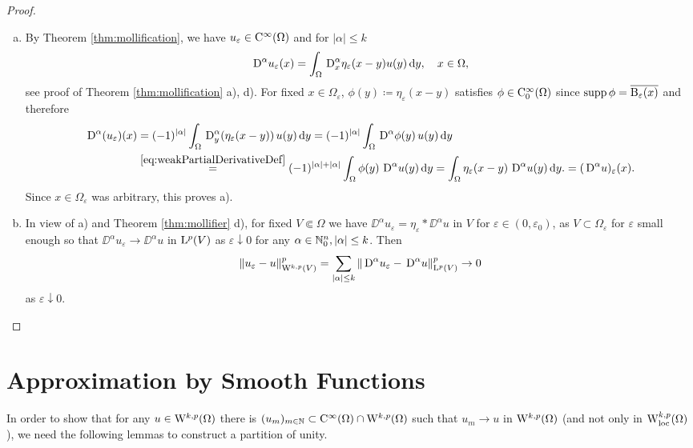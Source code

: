\begin{proof}
  \begin{enumerate}[a)]
    \item By Theorem \ref{thm:mollification}, we have $u_\varepsilon \in \mathrm{C}^\infty(\Omega)$ and for $|\alpha| \leq k$
  $$
    \,{\operatorname{D}}^\alpha u_\varepsilon(x) = \int_\Omega \,{\operatorname{D}}_x^\alpha \eta_\varepsilon(x - y) u(y) \, {\operatorname{d}\!{y}}, \quad x \in \Omega,
  $$
    see proof of Theorem \ref{thm:mollification} a), d).
    For fixed $x \in \Omega_\varepsilon$, $\phi(y) \coloneqq \eta_\varepsilon(x - y)$ satisfies $\phi \in \mathrm{C}_0^\infty(\Omega)$ since $\operatorname{supp} \phi = \overline{\mathrm{B}_\varepsilon(x)}$ and therefore
    \begin{align*}
      \,{\operatorname{D}}^\alpha (u_\varepsilon)(x) 
      &= (-1)^{|\alpha|} \int_\Omega \,{\operatorname{D}}_y^\alpha (\eta_\varepsilon (x - y))\, u(y) \, {\operatorname{d}\!{y}}
      = (-1)^{|\alpha|} \int_\Omega \,{\operatorname{D}}^\alpha \phi(y) \, u(y) \, {\operatorname{d}\!{y}} \\
      &\overset{\eqref{eq:weakPartialDerivativeDef}}{=} (-1)^{|\alpha| + |\alpha|} \int_\Omega \phi(y) \, \,{\operatorname{D}}^\alpha u(y) \, {\operatorname{d}\!{y}}
      = \int_\Omega \eta_\varepsilon(x - y)\, \,{\operatorname{D}}^\alpha u(y) \, {\operatorname{d}\!{y}}.
      = (\,{\operatorname{D}}^\alpha u)_\varepsilon(x).
    \end{align*}
    Since $x \in \Omega_\varepsilon$ was arbitrary, this proves a).

  \item In view of a) and Theorem \ref{thm:mollifier} d), for fixed $V \Subset \Omega$ we have $\DD^\alpha u_\varepsilon = \eta_\varepsilon \ast \DD^\alpha u$ in $V$ for $\varepsilon \in (0,\varepsilon_0)$, as $V \subset \Omega_\varepsilon$ for $\varepsilon$ small enough so that $\DD^\alpha u_\varepsilon \to \DD^\alpha u$ in $\mathrm{L}^p(V)$ as $\varepsilon \downarrow 0$ for any $\alpha \in \mathbb{N}_0^n, |\alpha| \leq k$.
     Then
     $$
     \|u_\varepsilon - u\|^p_{\mathrm{W}^{k,p}(V)} = \sum_{|\alpha| \leq k} \|\,{\operatorname{D}}^\alpha u_\varepsilon - \,{\operatorname{D}}^\alpha u\|_{\mathrm{L}^p(V)}^p \to 0
     $$
     as $\varepsilon \downarrow 0$.
 \end{enumerate}
\end{proof}

\section{Approximation by Smooth Functions}

In order to show that for any $u \in \mathrm{W}^{k,p}(\Omega)$ there is $(u_m)_{m \in \mathbb{N}} \subset \mathrm{C}^\infty(\Omega) \cap \mathrm{W}^{k,p}(\Omega)$ such that $u_m \to u$ in $\mathrm{W}^{k,p}(\Omega)$ (and not only in $\mathrm{W}^{k,p}_{\operatorname{loc}}(\Omega)$), we need the following lemmas to construct a partition of unity.


